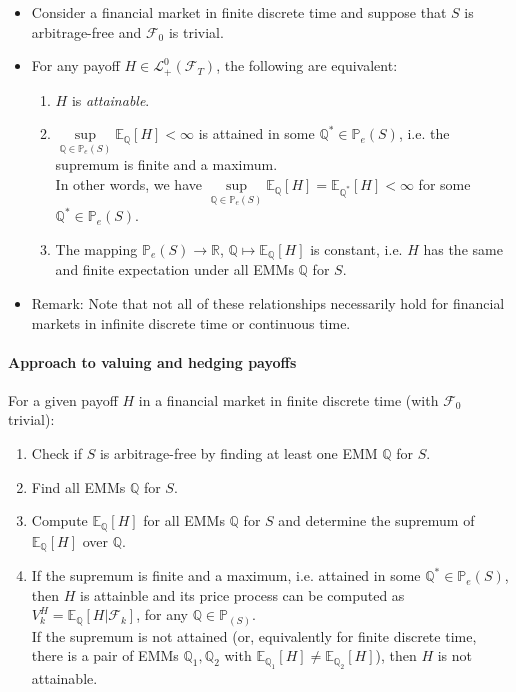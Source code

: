 \documentclass[a4paper,landscape,8pt,fleqn]{scrartcl}
\begin{document}
\begin{multicols*}{3}
\begin{itemize}
\item Consider a financial market in finite discrete time and suppose that $S$ is arbitrage-free and $\mathcal{F}_0$ is trivial.
\item For any payoff $H \in \mathcal{L}_+^0(\mathcal{F}_T)$, the following are equivalent:
\begin{enumerate}
\item $H$ is \textit{attainable}.
\item $\sup\limits_{\mathbb{Q} \in \mathbb{P}_e(S)} \mathbb{E}_\mathbb{Q}[H] < \infty$ is attained in some $\mathbb{Q}^\ast \in \mathbb{P}_e(S)$, i.e. the supremum is finite and a maximum. \\
In other words, we have $\sup\limits_{\mathbb{Q} \in \mathbb{P}_e(S)} \mathbb{E}_\mathbb{Q}[H] = \mathbb{E}_{\mathbb{Q}^\ast}[H] < \infty$ for some $\mathbb{Q}^\ast \in \mathbb{P}_e(S)$.
\item The mapping $\mathbb{P}_e(S) \rightarrow \mathbb{R}$, $\mathbb{Q} \mapsto \mathbb{E}_\mathbb{Q}[H]$ is constant, i.e. $H$ has the same and finite expectation under all EMMs $\mathbb{Q}$ for $S$.
\end{enumerate}
\item Remark: Note that not all of these relationships necessarily hold for financial markets in infinite discrete time or continuous time.
\end{itemize}

\paragraph{Approach to valuing and hedging payoffs}

For a given payoff $H$ in a financial market in finite discrete time (with $\mathcal{F}_0$ trivial):

\begin{enumerate}
\item Check if $S$ is arbitrage-free by finding at least one EMM $\mathbb{Q}$ for $S$.
\item Find all EMMs $\mathbb{Q}$ for $S$.
\item Compute $\mathbb{E}_\mathbb{Q}[H]$ for all EMMs $\mathbb{Q}$ for $S$ and determine the supremum of $\mathbb{E}_\mathbb{Q}[H]$ over $\mathbb{Q}$.
\item If the supremum is finite and a maximum, i.e. attained in some $\mathbb{Q}^\ast \in \mathbb{P}_e(S)$, then $H$ is attainble and its price process can be computed as $V_k^H = \mathbb{E}_\mathbb{Q}[H | \mathcal{F}_k]$, for any $\mathbb{Q} \in \mathbb{P}_(S)$. \\
If the supremum is not attained (or, equivalently for finite discrete time, there is a pair of EMMs $\mathbb{Q}_1, \mathbb{Q}_2$ with $\mathbb{E}_{\mathbb{Q}_1}[H] \neq \mathbb{E}_{\mathbb{Q}_2}[H]$), then $H$ is not attainable.
\end{enumerate}


\end{multicols*}
\end{document}
